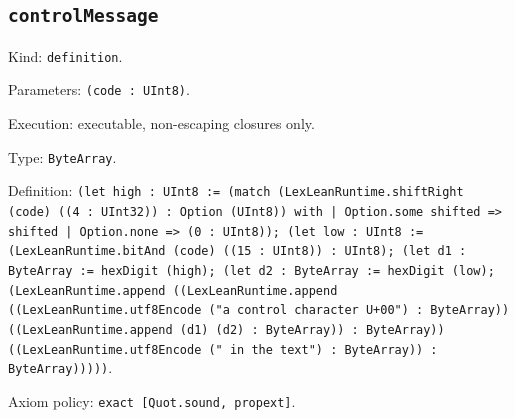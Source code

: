 \documentclass[11pt]{article}
\begin{document}
\subsection*{\texttt{controlMessage}}
\noindent Kind: \texttt{definition}.\par
\noindent Parameters: \texttt{(code : UInt8)}.\par
\noindent Execution: executable, non-escaping closures only.\par
\noindent Type: \texttt{ByteArray}.\par
\noindent Definition: \texttt{(let high : UInt8 := (match (LexLeanRuntime.shiftRight (code) ((4 : UInt32)) : Option (UInt8)) with | Option.some shifted => shifted | Option.none => (0 : UInt8)); (let low : UInt8 := (LexLeanRuntime.bitAnd (code) ((15 : UInt8)) : UInt8); (let d1 : ByteArray := hexDigit (high); (let d2 : ByteArray := hexDigit (low); (LexLeanRuntime.append ((LexLeanRuntime.append ((LexLeanRuntime.utf8Encode ("a control character U+00") : ByteArray)) ((LexLeanRuntime.append (d1) (d2) : ByteArray)) : ByteArray)) ((LexLeanRuntime.utf8Encode (" in the text") : ByteArray)) : ByteArray)))))}.\par
\noindent Axiom policy: \texttt{exact [Quot.sound, propext]}.\par
\end{document}
